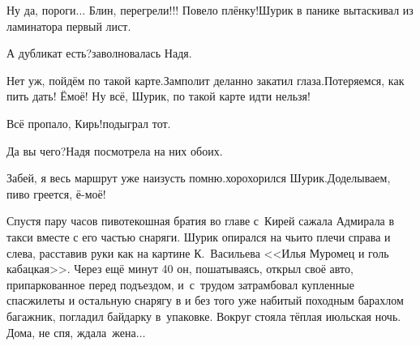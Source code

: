 \diagdash Ну да, пороги$\ldots$ Блин, перегрели!!! Повело плёнку!\mdash Шурик в панике вытаскивал из ламинатора первый лист.%

\diagdash А дубликат есть?\mdash заволновалась Надя.

\diagdash Нет уж, пойдём по такой карте.\mdash Замполит деланно закатил глаза.\mdash Потеряемся, как пить дать! Ё\sdash моё! Ну всё, Шурик, по такой карте идти нельзя! 

\diagdash Всё пропало, Кирь!\mdash подыграл тот.

\diagdash Да вы чего?\mdash Надя посмотрела на них обоих.

\diagdash Забей, я весь маршрут уже наизусть помню.\mdash хорохорился Шурик.\mdash Доделываем, пиво греется, ё-моё!

Спустя пару часов пивотекошная братия во главе с~Кирей сажала Адмирала в такси вместе с его частью снаряги. Шурик опирался на чьи\sdash то плечи справа и слева, расставив руки как на картине К.~Васильева <<Илья Муромец и голь кабацкая>>. Через ещё минут 40 он, пошатываясь, открыл своё авто, припаркованное перед подъездом, и~с~трудом затрамбовал купленные спасжилеты и остальную снарягу в и без того уже набитый походным барахлом багажник, погладил байдарку в~упаковке. Вокруг стояла тёплая июльская ночь. Дома, не спя, ждала~жена$\ldots$

\begin{center}
\end{center}
